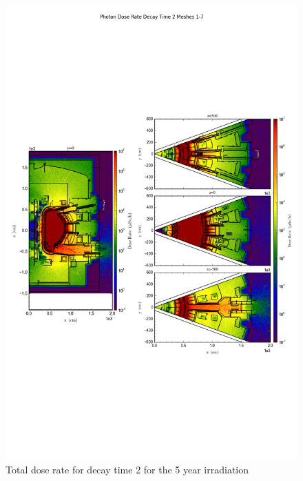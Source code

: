 \documentclass[12pt]{article}
\begin{document}
\begin{figure}[ht!]
\centering
\includegraphics[trim={0cm 8cm, 0cm 8cm},clip,scale=0.75]{../plots/final_model_with_b4c/5year/Photon_Dose_Rate_Decay_Time_2_Meshes_1-7.png}
\caption{Total dose rate for decay time 2 for the 5 year irradiation}
\label{fig:photons_5y_dc2_nob4c_dose}
\end{figure}
\end{document}
